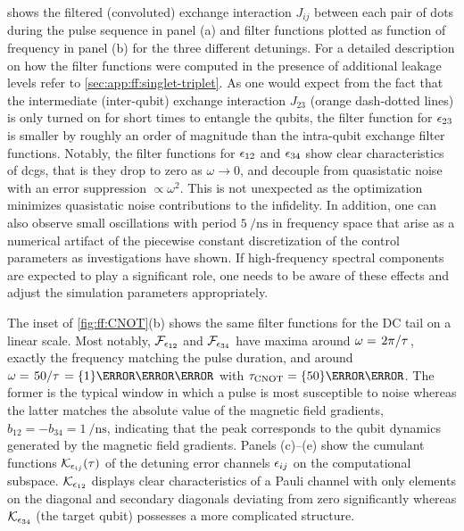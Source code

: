  shows the filtered (convoluted) exchange interaction $J_{ij}$ between each pair of dots during the pulse sequence in panel (a) and filter functions plotted as function of frequency in panel (b) for the three different detunings.
For a detailed description on how the filter functions were computed in the presence of additional leakage levels refer to \cref{sec:app:ff:singlet-triplet}.
As one would expect from the fact that the intermediate (inter-qubit) exchange interaction $J_{23}$ (orange dash-dotted lines) is only turned on for short times to entangle the qubits, the filter function for $\epsilon_{23}$ is smaller by roughly an order of magnitude than the intra-qubit exchange filter functions.
Notably, the filter functions for $\epsilon_{12}$ and $\epsilon_{34}$ show clear characteristics of \glspl{dcg}, that is they drop to zero as $\omega\rightarrow 0$, and decouple from quasistatic noise with an error suppression $\propto\omega^2$.
This is not unexpected as the optimization minimizes quasistatic noise contributions to the infidelity.
In addition, one can also observe small oscillations with period $\qty{5}{\per\nano\second}$ in frequency space that arise as a numerical artifact of the piecewise constant discretization of the control parameters as investigations have shown.
If high-frequency spectral components are expected to play a significant role, one needs to be aware of these effects and adjust the simulation parameters appropriately.

The inset of \cref{fig:ff:CNOT}(b) shows the same filter functions for the DC tail on a linear scale.
Most notably, $\mathcal{F}_{\epsilon_{12}}$ and $\mathcal{F}_{\epsilon_{34}}$ have maxima around $\omega = \flatfrac{2\pi}{\tau}$, \ie exactly the frequency matching the pulse duration, and around $\omega = \flatfrac{50}{\tau} = \qty{1}{\per\nano\second}$ with $\tau_{\CNOT} = \qty{50}{\nano\second}$.
The former is the typical window in which a pulse is most susceptible to noise whereas the latter matches the absolute value of the magnetic field gradients, $b_{12} = -b_{34} = \qty{1}{\per\nano\second}$, indicating that the peak corresponds to the qubit dynamics generated by the magnetic field gradients.
Panels (c)--(e) show the cumulant functions $\mathcal{K}_{\epsilon_{ij}}(\tau)$ of the detuning error channels $\epsilon_{ij}$ on the computational subspace.
$\mathcal{K}_{\epsilon_{12}}$ displays clear characteristics of a Pauli channel with only elements on the diagonal and secondary diagonals deviating from zero significantly whereas $\mathcal{K}_{\epsilon_{34}}$ (the target qubit) possesses a more complicated structure.

